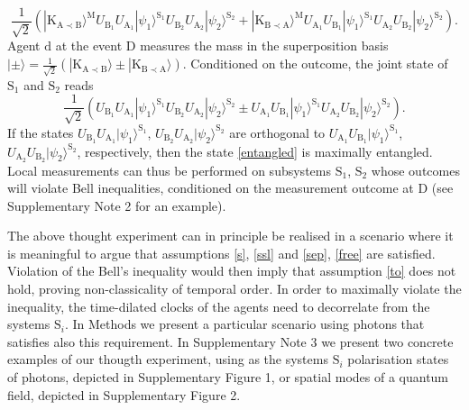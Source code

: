 \documentclass[a4paper,11pt]{article}
\newcommand{\ket}{\rangle}
\begin{document}
%
\begin{equation}
\frac{1}{\sqrt{2}}\left(|\mathrm{K_{A\prec B}}\ket^\mathrm{M} U_\mathrm{B_1}U_\mathrm{A_1}|\psi_1\ket^\mathrm{S_1} U_\mathrm{B_2}U_\mathrm{A_2}|\psi_2\ket^\mathrm{S_2} + |\mathrm{K_{B\prec A}}\ket^\mathrm{M} U_\mathrm{A_1}U_\mathrm{B_1}|\psi_1\ket^\mathrm{S_1} U_\mathrm{A_2}U_\mathrm{B_2}|\psi_2\ket^\mathrm{S_2}\right).
\end{equation}
%
Agent $\mathrm d$ at the event $\mathrm D$ measures the mass in the superposition basis $|\pm\ket = \frac{1}{\sqrt{2}}\left( |\mathrm{K_{A\prec B}}\ket \pm |\mathrm{K_{B\prec A}}\ket\right)$. Conditioned on the outcome, the joint state of $\mathrm S_1$ and $\mathrm S_2$ reads
%
\begin{equation}
\label{entangled}
\frac{1}{\sqrt{2}}\left(U_\mathrm{B_1}U_\mathrm{A_1}|\psi_1\ket^\mathrm{S_1} U_\mathrm{B_2}U_\mathrm{A_2}|\psi_2\ket^\mathrm{S_2} \pm U_\mathrm{A_1}U_\mathrm{B_1}|\psi_1\ket^\mathrm{S_1} U_\mathrm{A_2}U_\mathrm{B_2}|\psi_2\ket^\mathrm{S_2}\right).
\end{equation}
%
If the states $U_\mathrm{B_1}U_\mathrm{A_1}|\psi_1\ket^\mathrm{S_1}$, $U_\mathrm{B_2}U_\mathrm{A_2}|\psi_2\ket^\mathrm{S_2}$ are orthogonal to $U_\mathrm{A_1}U_\mathrm{B_1}|\psi_1\ket^\mathrm{S_1}$, $U_\mathrm{A_2}U_\mathrm{B_2}|\psi_2\ket^\mathrm{S_2}$, respectively, then the state \eqref{entangled} is maximally entangled. Local measurements can thus be performed on subsystems $\mathrm S_1$, $\mathrm S_2$ whose outcomes will violate Bell inequalities, conditioned on the measurement outcome at $ \mathrm D$ (see Supplementary Note 2 for an example).

The above {thought experiment} can in principle be realised in a scenario where it is meaningful to argue that assumptions \ref{s}, \ref{ssl} and \ref{sep}, \ref{free} are satisfied.  Violation of the Bell's inequality would then imply that assumption \ref{to} does not hold,  proving non-classicality of temporal order.  In order to maximally violate the inequality,  the time-dilated clocks of the agents need to decorrelate from the systems $\mathrm S_i$. In Methods we present a particular scenario using photons that satisfies also this requirement.
In Supplementary Note 3 we present two concrete examples of our thougth experiment, using  as the systems $\mathrm S_i$ polarisation states of photons, depicted in Supplementary Figure 1, or spatial modes of a quantum field, depicted in Supplementary Figure 2.
\end{document}
